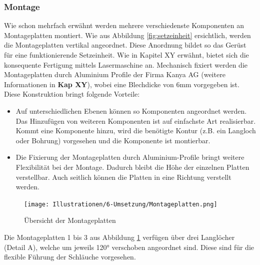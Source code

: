 \subsubsection{Montage}
Wie schon mehrfach erwähnt werden mehrere verschiedenste Komponenten an Montageplatten montiert. Wie aus Abbildung \ref{fig:setzeinheit} ersichtlich, werden die Montageplatten vertikal angeordnet. Diese Anordnung bildet so das Gerüst für eine funktionierende Setzeinheit. Wie in Kapitel XY erwähnt, bietet sich die konsequente Fertigung mittels Lasermaschine an. Mechanisch fixiert werden die Montageplatten durch Aluminium Profile der Firma Kanya AG (weitere Informationen in \textbf{Kap XY}), wobei eine Blechdicke von 6mm vorgegeben ist. Diese Konstruktion bringt folgende Vorteile:
	\begin{itemize}
	\item Auf unterschiedlichen Ebenen können so Komponenten angeordnet werden. Das Hinzufügen von weiteren Komponenten ist auf einfachste Art realisierbar. Kommt eine Komponente hinzu, wird die benötigte Kontur (z.B. ein Langloch oder Bohrung) vorgesehen und die Komponente ist montierbar.
	\item Die Fixierung der Montageplatten durch Aluminium-Profile bringt weitere Flexibilität bei der Montage. Dadurch bleibt die Höhe der einzelnen Platten verstellbar. Auch seitlich können die Platten in eine Richtung verstellt werden.
\end{itemize}
 	\begin{figure}[H]
	\texttt{[image: Illustrationen/6-Umsetzung/Montageplatten.png]}
	\caption{Übersicht der Montageplatten}
	\label{fig:montageplatten}
\end{figure}
Die Montageplatten 1 bis 3 aus Abbildung \ref{fig:montageplatten} verfügen über drei Langlöcher (Detail A), welche um jeweils 120° verschoben angeordnet sind. Diese sind für die flexible Führung der Schläuche vorgesehen.